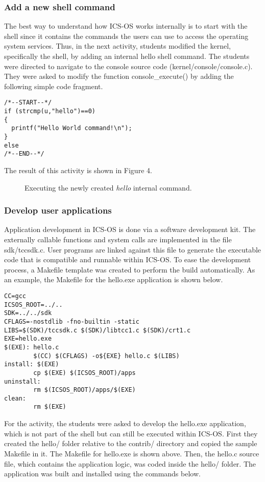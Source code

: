 \documentclass{acm_proc_article-sp}
\begin{document}
\subsubsection{Add a new shell command}
The best way to understand how ICS-OS works internally is to start with the 
shell since it contains the commands the users can use to access the 
operating system services. Thus, in the next activity, students modified the 
kernel, specifically the shell, by adding an internal hello shell command. 
The students were directed to navigate to the console source code
(kernel/console/console.c). They were asked to modify the function
console\_execute() by adding the following simple code fragment.

\begin{verbatim}
/*--START--*/
if (strcmp(u,"hello")==0)
{
  printf("Hello World command!\n");
}
else
/*--END--*/
\end{verbatim}

The result of this activity is shown in Figure 4.

\begin{figure}
\centering
{}
\caption{Executing the newly created \textit{hello} internal command.}
\end{figure}


\subsubsection{Develop user applications}
Application development in ICS-OS is done via a software development kit.
The externally callable functions and system calls are implemented in the file 
sdk/tccsdk.c. User programs are linked against this file to generate the
executable code that is compatible and runnable within ICS-OS. To ease the 
development process, a Makefile template was created to perform the build
automatically. As an example, the Makefile for the hello.exe application is
shown below.

\begin{verbatim}
CC=gcc
ICSOS_ROOT=../..
SDK=../../sdk
CFLAGS=-nostdlib -fno-builtin -static
LIBS=$(SDK)/tccsdk.c $(SDK)/libtcc1.c $(SDK)/crt1.c
EXE=hello.exe
$(EXE): hello.c
        $(CC) $(CFLAGS) -o${EXE} hello.c $(LIBS)
install: $(EXE)
        cp $(EXE) $(ICSOS_ROOT)/apps
uninstall:
        rm $(ICSOS_ROOT)/apps/$(EXE)
clean:
        rm $(EXE)
\end{verbatim}

For the activity, the students were asked to develop the hello.exe 
application, which is not part of the shell but can still be executed 
within ICS-OS. First they created the hello/ folder relative to the contrib/ 
directory and copied the sample Makefile in it. The Makefile for hello.exe 
is shown above. Then, the hello.c source file, which contains the application
logic, was coded inside the hello/ folder. The application was built and
installed using the commands below.
\end{document}
